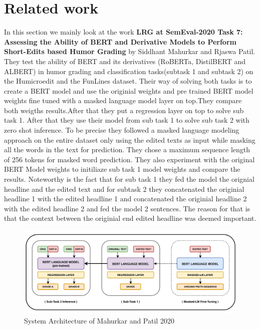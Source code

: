 \documentclass[11pt,a4paper,onecolumn,oneside,notitlepage]{article}
\begin{document}
	\section{Related work}
		In this section we mainly look at the work \textbf{LRG at SemEval-2020 Task 7: Assessing the Ability of BERT and
		Derivative Models to Perform Short-Edits based Humor Grading} by Siddhant Mahurkar and Rjaswa Patil. 
		They test the ability of BERT and its derivatives (RoBERTa, DistilBERT and ALBERT) in humor grading and classification tasks(subtask 1 and subtask 2) on the Humicroedit and the FunLines dataset.
		Their way of solving both tasks is to create a  BERT model and use the originial weights and  pre trained BERT model weights  fine tuned  with a masked language model layer on top.They compare both weigths results.After that they put a regression layer on top to solve sub task 1. After that they use their model from sub task 1 to solve sub task 2 with zero shot inference. 
		To be precise they followed a masked language modeling approach on the entire dataset only using the edited texts as input while masking all the words in the text for prediction. They chose a maximum sequence length of 256 tokens for masked word prediction. They also experiment with the original BERT Model weights to initiliaze sub task 1 model weights and compare the results.
		Noteworthy is the fact that for sub  task 1 they fed the model the orignial headline and the edited text and for subtask 2 they concatenated the originial headline 1 with the edited headline 1 and concatenated the originial headline 2 with the edited headline 2 and fed the model 2 sentences.
		The reason for that is that the context between the originial end edited headline was deemed important.
		\begin{figure}
			\begin{center}
			\includegraphics[width=1.0\linewidth]{system_architecture.png}
			\end{center}
			
			\caption{System Architecture of Mahurkar and Patil 2020}\label{fig1}
		\end{figure}
	
\end{document}
